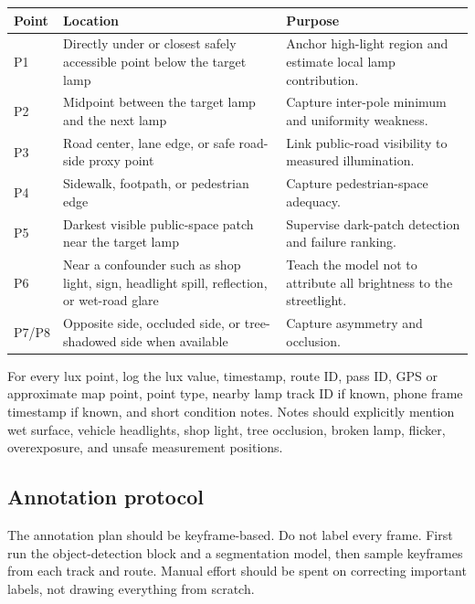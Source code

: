 \documentclass[11pt]{article}
\renewcommand{\arraystretch}{1.18}
\begin{document}
\begingroup
\small
\setlength{\tabcolsep}{4pt}
\renewcommand{\arraystretch}{1.15}
\begin{center}
\begin{tabularx}{\textwidth}{>{\raggedright\arraybackslash}p{}>{\raggedright\arraybackslash}X>{\raggedright\arraybackslash}p{}}
\toprule
Point & Location & Purpose \\
\midrule
P1 & Directly under or closest safely accessible point below the target lamp & Anchor high-light region and estimate local lamp contribution. \\
P2 & Midpoint between the target lamp and the next lamp & Capture inter-pole minimum and uniformity weakness. \\
P3 & Road center, lane edge, or safe road-side proxy point & Link public-road visibility to measured illumination. \\
P4 & Sidewalk, footpath, or pedestrian edge & Capture pedestrian-space adequacy. \\
P5 & Darkest visible public-space patch near the target lamp & Supervise dark-patch detection and failure ranking. \\
P6 & Near a confounder such as shop light, sign, headlight spill, reflection, or wet-road glare & Teach the model not to attribute all brightness to the streetlight. \\
P7/P8 & Opposite side, occluded side, or tree-shadowed side when available & Capture asymmetry and occlusion. \\
\bottomrule
\end{tabularx}
\end{center}
\endgroup

For every lux point, log the lux value, timestamp, route ID, pass ID, GPS or approximate map point, point type, nearby lamp track ID if known, phone frame timestamp if known, and short condition notes. Notes should explicitly mention wet surface, vehicle headlights, shop light, tree occlusion, broken lamp, flicker, overexposure, and unsafe measurement positions.

\subsection{Annotation protocol}

The annotation plan should be keyframe-based. Do not label every frame. First run the object-detection block and a segmentation model, then sample keyframes from each track and route. Manual effort should be spent on correcting important labels, not drawing everything from scratch.
\end{document}
